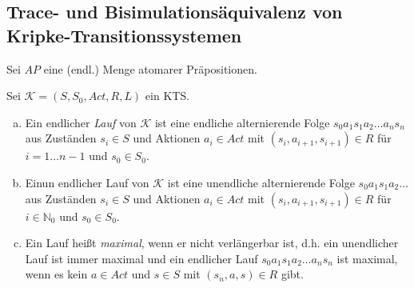 \subsection{Trace- und Bisimulationsäquivalenz von Kripke-Transitionssystemen}
Sei $AP$ eine (endl.) Menge atomarer Präpositionen.

\begin{defn}[Läufe]
	Sei $\mathcal{K} = (S, S_0, \textit{Act}, R, L)$ ein KTS.
	\begin{enumerate}[a)]
		\item Ein endlicher \emph{Lauf} von $\mathcal{K}$ ist eine endliche alternierende Folge $s_0 a_1 s_1 a_2 \dots a_n s_n$ aus Zuständen $s_i \in S$ und Aktionen $a_i \in \textit{Act}$ mit $(s_i,a_{i+1}, s_{i+1}) \in R$ für $i=1 \dots n-1$ und $s_0 \in S_0$.
		
		\item Einun endlicher Lauf von $\mathcal{K}$ ist eine unendliche alternierende Folge $s_0 a_1 s_1 a_2 \dots$ aus Zuständen $s_i \in S$ und Aktionen $a_i \in \textit{Act}$ mit $(s_i,a_{i+1}, s_{i+1}) \in R$ für $i \in \mathbb{N}_0$ und $s_0 \in S_0$.
		
		\item Ein Lauf heißt \emph{maximal}, wenn er nicht verlängerbar ist, d.h. ein unendlicher Lauf ist immer maximal und ein endlicher Lauf $s_0 a_1 s_1 a_2 \dots a_n s_n$ ist maximal, wenn es kein $a \in \textit{Act}$ und $s \in S$ mit $(s_n, a, s) \in R$ gibt.
	\end{enumerate}
\end{defn}

